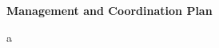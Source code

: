 \documentclass[11pt]{NSFamsart}
\begin{document}

\centerline{\textbf{\Large Management and Coordination Plan}}

\bigskip

a
\end{document}
